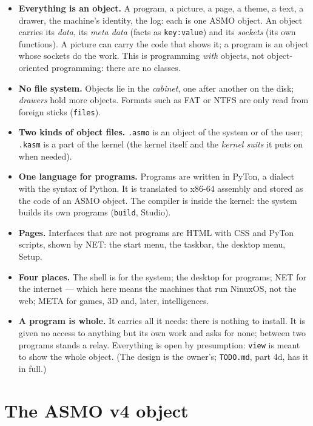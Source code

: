 \documentclass[11pt,a4paper]{article}
\newcommand{\file}[1]{\texttt{#1}}
\newcommand{\cmd}[1]{\texttt{#1}}
\begin{document}
\begin{itemize}
\item \textbf{Everything is an object.} A program, a picture, a page, a theme, a text, a drawer,
      the machine's identity, the log: each is one ASMO object. An object carries its \emph{data},
      its \emph{meta data} (facts as \texttt{key:value}) and its \emph{sockets} (its own functions).
      A picture can carry the code that shows it; a program is an object whose sockets do the work.
      This is programming \emph{with} objects, not object-oriented programming: there are no classes.
\item \textbf{No file system.} Objects lie in the \emph{cabinet}, one after another on the disk;
      \emph{drawers} hold more objects. Formats such as FAT or NTFS are only read from foreign
      sticks (\cmd{files}).
\item \textbf{Two kinds of object files.} \file{.asmo} is an object of the system or of the user;
      \file{.kasm} is a part of the kernel (the kernel itself and the \emph{kernel suits} it puts
      on when needed).
\item \textbf{One language for programs.} Programs are written in PyTon, a dialect with the syntax
      of Python. It is translated to x86-64 assembly and stored as the code of an ASMO object. The
      compiler is inside the kernel: the system builds its own programs (\cmd{build}, Studio).
\item \textbf{Pages.} Interfaces that are not programs are HTML with CSS and PyTon scripts, shown
      by NET: the start menu, the taskbar, the desktop menu, Setup.
\item \textbf{Four places.} The shell is for the system; the desktop for programs; NET for the
      internet --- which here means the machines that run NinuxOS, not the web; META for games,
      3D and, later, intelligences.
\item \textbf{A program is whole.} It carries all it needs: there is nothing to install. It is
      given no access to anything but its own work and asks for none; between two programs
      stands a relay. Everything is open by presumption: \cmd{view} is meant to show the whole
      object. (The design is the owner's; \file{TODO.md}, part 4d, has it in full.)
\end{itemize}

\section{The ASMO v4 object}\label{sec:asmo}
\end{document}
